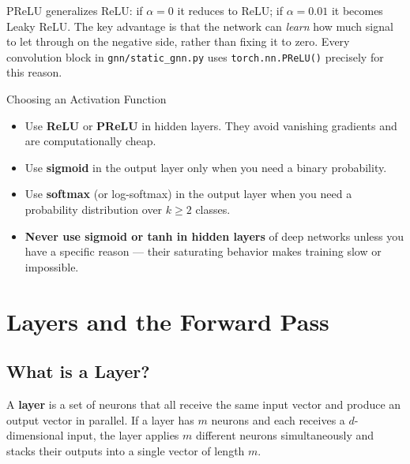 PReLU generalizes ReLU: if $\alpha = 0$ it reduces to ReLU; if $\alpha = 0.01$ it becomes Leaky ReLU. The key advantage is that the network can \emph{learn} how much signal to let through on the negative side, rather than fixing it to zero. Every convolution block in \texttt{gnn/static\_gnn.py} uses \texttt{torch.nn.PReLU()} precisely for this reason.

\begin{keyinsight}{Choosing an Activation Function}
\begin{itemize}
    \item Use \textbf{ReLU} or \textbf{PReLU} in hidden layers. They avoid vanishing gradients and are computationally cheap.
    \item Use \textbf{sigmoid} in the output layer only when you need a binary probability.
    \item Use \textbf{softmax} (or log-softmax) in the output layer when you need a probability distribution over $k \ge 2$ classes.
    \item \textbf{Never use sigmoid or tanh in hidden layers} of deep networks unless you have a specific reason --- their saturating behavior makes training slow or impossible.
\end{itemize}
\end{keyinsight}

\section{Layers and the Forward Pass}
\label{sec:forward_pass}

\subsection{What is a Layer?}

A \textbf{layer} is a set of neurons that all receive the same input vector and produce an output vector in parallel. If a layer has $m$ neurons and each receives a $d$-dimensional input, the layer applies $m$ different neurons simultaneously and stacks their outputs into a single vector of length $m$.


